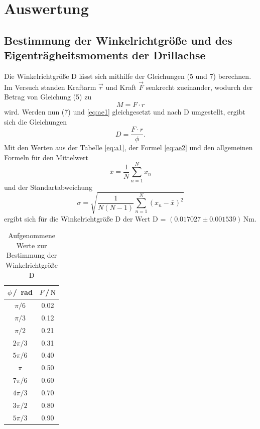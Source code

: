 \section{Auswertung}
\label{sec:Auswertung}


\subsection{Bestimmung der Winkelrichtgröße und des Eigenträgheitsmoments der Drillachse}

Die Winkelrichtgröße D lässt sich mithilfe der Gleichungen (5 und 7) berechnen. Im Versuch standen 
Kraftarm $\vec{r}$ und Kraft $\vec{F}$ senkrecht zueinander, wodurch der Betrag von Gleichung (5) 
zu
\begin{equation}
    M = F \cdot r
    \label{eq:ae1}
\end{equation}
\noindent
wird. Werden nun (7) und \ref{eq:ae1} gleichgesetzt und nach D umgestellt, ergibt sich die Gleichungen
\begin{equation}
    D = \frac{F\cdot r}{\phi}.
    \label{eq:ae2}
\end{equation}
\noindent
Mit den Werten aus der Tabelle \ref{eq:a1}, der Formel \ref{eq:ae2} und den allgemeinen Formeln für den Mittelwert
\begin{equation}
    \bar{x} = \frac{1}{N} \sum_{n=1}^N x_n 
    \label{eq:ae3}
\end{equation}
\noindent
und der Standartabweichung
\begin{equation}
    \sigma = \sqrt{\frac{1}{N(N-1)} \sum_{n=1}^N (x_n - \bar{x})^2}
\end{equation}
\noindent
ergibt sich für die Winkelrichtgröße D der Wert D = $(0.017027 \pm 0.001539)\,$Nm.

\begin{table}[H]
\normalsize

\centering
{}
\begin{tabular}{c c}
\toprule
    $\phi$\,/\, rad & $F$\,/\,$\si{\newton}$ \\
    \midrule

$\pi/6$  &   0.02   \\
$\pi/3$  &   0.12   \\
$\pi/2$  &   0.21   \\
$2\pi/3$ &   0.31   \\
$5\pi/6$ &   0.40   \\
$\pi$    &   0.50   \\
$7\pi/6$ &   0.60   \\
$4\pi/3$ &   0.70   \\
$3\pi/2$ &   0.80   \\
$5\pi/3$ &   0.90   \\ 

    \bottomrule
\end{tabular}
\caption{Aufgenommene Werte zur Bestimmung der Winkelrichtgröße D}
\label{tab:a1}
\end{table}














